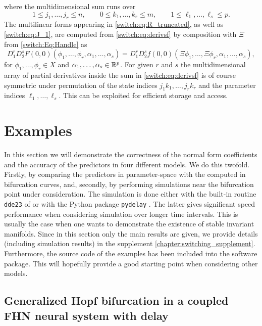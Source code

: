 where the multidimensional sum runs over
\[
1 \le j_1, \ldots, j_r \le n, \qquad 0 \le k_1, \ldots, k_r \le m, \qquad 1 \le \ell_1, \ldots, \ell_s \le p.
\]
The multilinear forms appearing in \cref{switch:eq:R_truncated}, as well as \cref{switch:eq:J_1}, are computed from \cref{switch:eq:derivsf} by composition with $\Xi$ from \cref{switch:Eq:Handle} as
\begin{equation*}
\label{switch:eq:multilinearforms}
D_1^rD_2^s F(0,0)(\phi_1,\ldots,\phi_r, \alpha_1, \ldots, \alpha_s) = D_1^rD_2^sf(0,0)(\Xi \phi_1,\ldots, \Xi \phi_r, \alpha_1, \ldots, \alpha_s),
\end{equation*}
for $\phi_1,\ldots,\phi_r \in X$ and $\alpha_1,\ldots, \alpha_s \in \mathbb{R}^p$. For given $r$ and $s$ the multidimensional array of partial derivatives inside the sum in \cref{switch:eq:derivsf} is of course symmetric under permutation of the state indices $j_1k_1,\ldots,j_rk_r$ and the parameter indices $\ell_1,\ldots,\ell_s$. This can be exploited for efficient storage and access.

\section{Examples\label{switch:sec:Examples}}
In this section we will demonstrate the correctness of the normal form coefficients and the accuracy of the predictors in four different models. We do this twofold. Firstly, by comparing the predictors in parameter-space with the computed in \DDEBIFTOOL bifurcation curves, and, secondly, by performing simulations near the bifurcation point under consideration. The simulation is done either with the built-in routine \texttt{dde23} of \MATLAB or with the Python package \texttt{pydelay} \cite{Flunkert2009Flunkert}. The latter gives significant speed performance when considering simulation over longer time intervals. This is usually the case when one wants to demonstrate the existence of stable invariant manifolds. Since in this section only the main results are given, we provide details (including simulation results) in the supplement \cref{chapter:switching_supplement}. Furthermore, the source code of the examples has been included into the \DDEBIFTOOL software package. This will hopefully provide a good starting point when considering other models.

\subsection{Generalized Hopf bifurcation in a coupled FHN neural system with delay}
\label{switch:sec:example_FHN}

